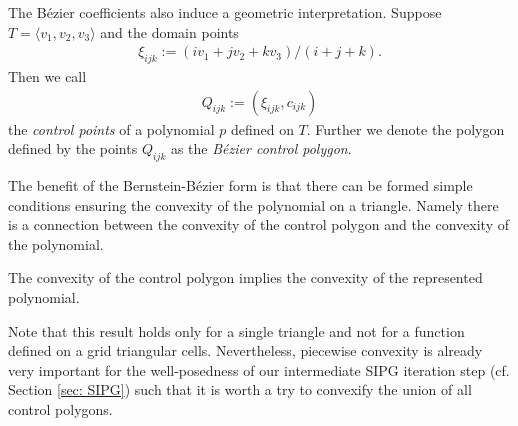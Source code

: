 The B\'ezier coefficients also induce a geometric interpretation. Suppose $T=\langle v_1, v_2, v_3 \rangle$ and the domain points
\begin{align}
	\xi_{ijk} := (i v_1+jv_2 + k v_3) / (i+j+k). \label{eq: domain points}
\end{align} 
Then we call 
\begin{align}
	Q_{ijk} := (\xi_{ijk}, c_{ijk}) \label{eq: control points}
\end{align} the \emph{control points} of a polynomial $p$ defined on $T$. Further we denote the polygon defined by the points $Q_{ijk}$ as the \emph{B\'ezier control polygon}.


The benefit of the Bernstein-B\'ezier form is that there can be formed simple conditions ensuring the convexity of the polynomial on a triangle. Namely there is a connection between the convexity of the control polygon and the convexity of the polynomial.
\begin{theorem}
	The convexity of the control polygon implies the convexity of the represented polynomial.
\end{theorem}
Note that this result holds only for a single triangle and not for a function defined on a grid triangular cells. Nevertheless, piecewise convexity is already very important for the well-posedness of our intermediate SIPG iteration step (cf. Section \ref{sec: SIPG}) such that it is worth a try to convexify the union of all control polygons.

